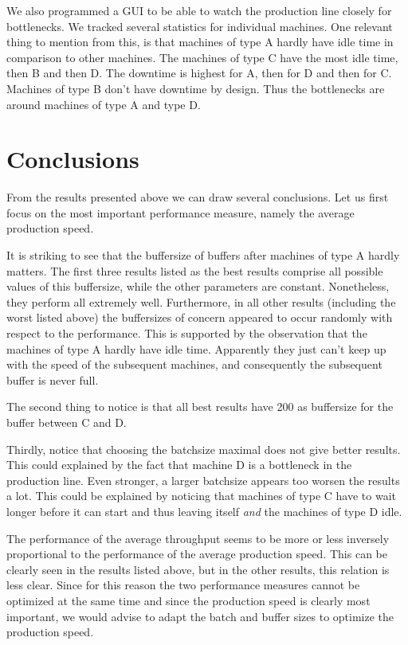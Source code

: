 \documentclass{report}
\begin{document}
We also programmed a GUI to be able to watch the production line closely for bottlenecks.
We tracked several statistics for individual machines.
One relevant thing to mention from this, is that machines of type A hardly have idle time in comparison to other machines.
The machines of type C have the most idle time, then B and then D.
The downtime is highest for A, then for D and then for C. Machines of type B don't have downtime by design.
Thus the bottlenecks are around machines of type A and type D.


\chapter{Conclusions}
From the results presented above we can draw several conclusions.
Let us first focus on the most important performance measure, namely the average production speed.

It is striking to see that the buffersize of buffers after machines of type A hardly matters.
The first three results listed as the best results comprise all possible values of this buffersize, while the other parameters are constant.
Nonetheless, they perform all extremely well.
Furthermore, in all other results (including the worst listed above) the buffersizes of concern appeared to occur randomly with respect to the performance.
This is supported by the observation that the machines of type A hardly have idle time.
Apparently they just can't keep up with the speed of the subsequent machines, and consequently the subsequent buffer is never full.

The second thing to notice is that all best results have 200 as buffersize for the buffer between C and D.

Thirdly, notice that choosing the batchsize maximal does not give better results.
This could explained by the fact that machine D is a bottleneck in the production line.
Even stronger, a larger batchsize appears too worsen the results a lot.
This could be explained by noticing that machines of type C have to wait longer before it can start and thus leaving itself \emph{and} the machines of type D idle.


The performance of the average throughput seems to be more or less inversely proportional to the performance of the average production speed.
This can be clearly seen in the results listed above, but in the other results, this relation is less clear. Since for this reason the two performance measures cannot be optimized at the same time and since the production speed is clearly most important, we would advise to adapt the batch and buffer sizes to optimize the production speed.
\end{document}

